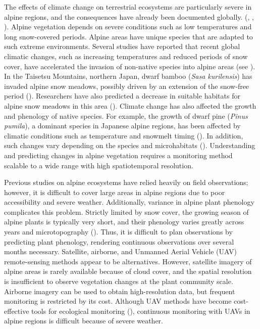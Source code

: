 \documentclass{article}
\begin{document}
The effects of climate change on terrestrial ecosystems are particularly severe in alpine regions, and the consequences have already been documented globally. (\cite{IPCC2007}, \cite{Gottfried2012NatClimChange}, \cite{IPCCSR2019HM}). Alpine vegetation depends on severe conditions such as low temperatures and long snow-covered periods. Alpine areas have unique species that are adapted to such extreme environments. Several studies have reported that recent global climatic changes, such as increasing temperatures and reduced periods of snow cover, have accelerated the invasion of non-native species into alpine areas (see \cite{Alexander2016AlpBotany}). In the Taisetsu Mountains, northern Japan, dwarf bamboo (\emph{Sasa kurilensis}) has invaded alpine snow meadows, possibly driven by an extension of the snow-free period (\cite{Kudo2011EcoEvo}). Researchers have also predicted a decrease in suitable habitats for alpine snow meadows in this area (\cite{Amagai2022AVS}). Climate change has also affected the growth and phenology of native species. For example, the growth of dwarf pine (\emph{Pinus pumila}), a dominant species in Japanese alpine regions, has been affected by climatic conditions such as temperature and snowmelt timing (\cite{Amagai2015EcoRes}). In addition, such changes vary depending on the species and microhabitats (\cite{Kudo2010AAA}). Understanding and predicting changes in alpine vegetation requires a monitoring method scalable to a wide range with high spatiotemporal resolution.

Previous studies on alpine ecosystems have relied heavily on field observations; however, it is difficult to cover large areas in alpine regions due to poor accessibility and severe weather. Additionally, variance in alpine plant phenology complicates this problem. Strictly limited by snow cover, the growing season of alpine plants is typically very short, and their phenology varies greatly across years and microtopography (\cite{Kudo1991AAR}). Thus, it is difficult to plan observations by predicting plant phenology, rendering continuous observations over several months necessary. Satellite, airborne, and Unmanned Aerial Vehicle (UAV) remote-sensing methods appear to be alternatives. However, satellite imagery of alpine areas is rarely available because of cloud cover, and the spatial resolution is insufficient to observe vegetation changes at the plant community scale. Airborne imagery can be used to obtain high-resolution data, but frequent monitoring is restricted by its cost. Although UAV methods have become cost-effective tools for ecological monitoring (\cite{Baena2017PLOSONE}), continuous monitoring with UAVs in alpine regions is difficult because of severe weather.
\end{document}
